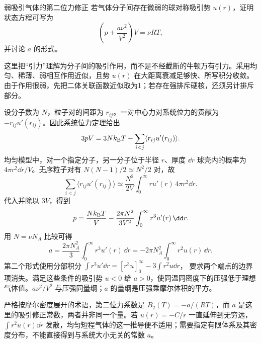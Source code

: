 \begin{practicebox}{弱吸引气体的第二位力修正}
若气体分子间存在微弱的球对称吸引势 $u(r)$，证明状态方程可写为
\[
 \left(p+\frac{a\nu^2}{V^2}\right)V=\nu RT,
\]
并讨论 $a$ 的形式。
\label{r2ch02:pr:013}
\begin{solution}
这里把“引力”理解为分子间的吸引作用，而不是不经截断的牛顿万有引力。采用均匀、稀薄、弱相互作用近似，且势 $u(r)$ 在大距离衰减足够快、所写积分收敛。由于作用很弱，先把二体关联函数近似取为1；若存在强排斥硬核，还须另计排斥部分。

设分子数为 $N$，粒子对的间距为 $r_{ij}$。一对中心力对系统位力的贡献为 $-r_{ij}u'(r_{ij})$。因此系统位力定理给出
\[
 3pV=3Nk_{\rm B}T-\sum_{i<j}\langle r_{ij}u'(r_{ij})\rangle.
\]
均匀模型中，对一个指定分子，另一分子位于半径 $r$、厚度 $\dd r$ 球壳内的概率为 $4\pi r^2\dd r/V$。无序粒子对有 $N(N-1)/2\simeq N^2/2$ 对，故
\[
 \sum_{i<j}\langle r_{ij}u'(r_{ij})\rangle
 \simeq\frac{N^2}{2V}\int_0^\infty r u'(r)\,4\pi r^2\dd r.
\]
代入并除以 $3V$，得到
\[
 p=\frac{Nk_{\rm B}T}{V}-\frac{2\pi N^2}{3V^2}
 \int_0^\infty r^3u'(r)\,\dd r.
\]
用 $N=\nu N_A$ 比较可得
\[
 \boxed{a=\frac{2\pi N_A^2}{3}\int_0^\infty r^3u'(r)\,\dd r
 =-2\pi N_A^2\int_0^\infty r^2u(r)\,\dd r}.
\]
第二个形式使用分部积分
$\int r^3u'\dd r=[r^3u]_0^\infty-3\int r^2u\dd r$，
要求两个端点的边界项消失。满足这些条件的吸引势 $u<0$ 给 $a>0$，使同温同密度下的压强低于理想气体值。$a\nu^2/V^2$ 与压强同量纲；$a$ 的量纲是压强乘摩尔体积的平方。

严格按摩尔密度展开的术语，第二位力系数是
$B_2(T)=-a/(RT)$，而 $a$ 是这里的吸引修正常数，两者并非同一个量。若 $u(r)=-C/r$ 一直延伸到无穷远，$\int r^2u(r)\dd r$ 发散，均匀短程气体的这一推导便不适用；需要指定有限体系及其密度分布，不能直接得到与系统大小无关的常数 $a$。
\end{solution}
\end{practicebox}

